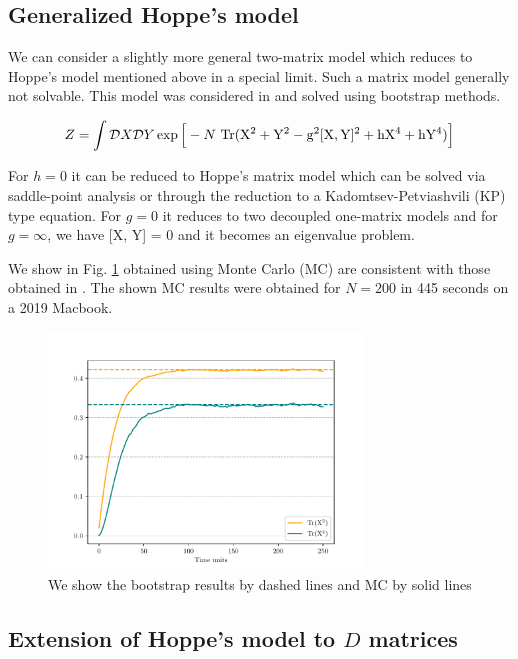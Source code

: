\documentclass[11pt]{article}
\begin{document}
\subsection{Generalized Hoppe's model}

We can consider a slightly more general two-matrix model which reduces to 
Hoppe's model mentioned above in a special limit. Such a matrix model generally not solvable. 
This model was considered in \cite{Kazakov:2021lel} and solved using bootstrap methods. 

\begin{equation}
\label{eq:GHM1} 
Z = \int \mathcal{D}X \mathcal{D}Y \exp \Big[-N ~ \rm{Tr} (X^2 + Y^2 - g^2 [X,Y]^2 + hX^4 + hY^4) \Big]	
\end{equation} 

For $h = 0$ it can be reduced to Hoppe's matrix model which can be solved via saddle-point analysis or through the reduction to a Kadomtsev-Petviashvili (KP) type equation. For $g = 0$ it reduces to two decoupled one-matrix models and for $g = \infty$, we have [X, Y] = 0 and it becomes an eigenvalue problem. 

We show in Fig. \ref{fig:2MM_match} obtained using Monte Carlo (MC) are 
consistent with those obtained in \cite{Kazakov:2021lel}. The shown MC 
results were obtained for $N=200$ in 445 seconds on a 2019 Macbook. 

\begin{figure}[htbp] 
	\centering 
	\includegraphics[width=0.75\textwidth]{figs/plot_2MM.pdf}
	\caption{\label{fig:2MM_match} We show the bootstrap results by dashed lines and MC by solid lines}
\end{figure}

\subsection{Extension of Hoppe's model to $D$ matrices}
\end{document}
